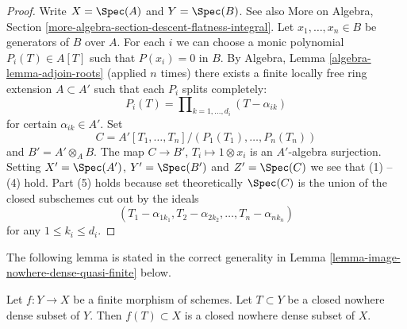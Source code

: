 \begin{proof}
Write $X = \Spec(A)$ and $Y = \Spec(B)$. See also
More on Algebra, Section \ref{more-algebra-section-descent-flatness-integral}.
Let $x_1, \ldots, x_n \in B$ be generators of $B$ over $A$.
For each $i$ we can choose a monic polynomial $P_i(T) \in A[T]$
such that $P(x_i) = 0$ in $B$. By
Algebra, Lemma \ref{algebra-lemma-adjoin-roots}
(applied $n$ times) there exists a finite locally free ring
extension $A \subset A'$ such that each $P_i$ splits completely:
$$
P_i(T) = \prod\nolimits_{k = 1, \ldots, d_i} (T - \alpha_{ik})
$$
for certain $\alpha_{ik} \in A'$. Set
$$
C = A'[T_1, \ldots, T_n]/(P_1(T_1), \ldots, P_n(T_n))
$$
and $B' = A' \otimes_A B$. The map $C \to B'$, $T_i \mapsto 1 \otimes x_i$
is an $A'$-algebra surjection. Setting $X' = \Spec(A')$,
$Y' = \Spec(B')$ and $Z' = \Spec(C)$ we see that
(1) -- (4) hold. Part (5) holds because set theoretically
$\Spec(C)$ is the union of the closed subschemes
cut out by the ideals
$$
(T_1 - \alpha_{1k_1}, T_2 - \alpha_{2k_2}, \ldots, T_n - \alpha_{nk_n})
$$
for any $1 \leq k_i \leq d_i$.
\end{proof}

\noindent
The following lemma is stated in the correct generality
in Lemma \ref{lemma-image-nowhere-dense-quasi-finite} below.

\begin{lemma}
\label{lemma-image-nowhere-dense-finite}
Let $f : Y \to X$ be a finite morphism of schemes.
Let $T \subset Y$ be a closed nowhere dense subset of $Y$.
Then $f(T) \subset X$ is a closed nowhere dense subset of $X$.
\end{lemma}

